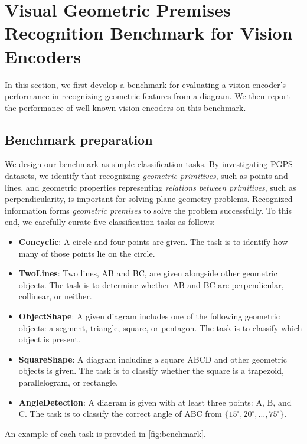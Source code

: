 \section{Visual Geometric Premises Recognition Benchmark for Vision Encoders}
\label{sec:visual_feature}

In this section, we first develop a benchmark for evaluating a vision encoder's performance in recognizing geometric features from a diagram. We then report the performance of well-known vision encoders on this benchmark.


\subsection{Benchmark preparation}
\label{sec:synthetic_data_engine}

We design our benchmark as simple classification tasks. By investigating PGPS datasets, we identify that recognizing \emph{geometric primitives}, such as points and lines, and geometric properties representing \emph{relations between primitives}, such as perpendicularity, is important for solving plane geometry problems. Recognized information forms \emph{geometric premises} to solve the problem successfully. To this end, we carefully curate five classification tasks as follows:
\begin{itemize}
    \item \textbf{Concyclic}: A circle and four points are given. The task is to identify how many of those points lie on the circle.
    \item \textbf{TwoLines}: Two lines, AB and BC, are given alongside other geometric objects. The task is to determine whether AB and BC are perpendicular, collinear, or neither.
    \item \textbf{ObjectShape}: A given diagram includes one of the following geometric objects: a segment, triangle, square, or pentagon. The task is to classify which object is present.
    \item \textbf{SquareShape}: A diagram including a square ABCD and other geometric objects is given. The task is to classify whether the square is a trapezoid, parallelogram, or rectangle.
    \item \textbf{AngleDetection}: A diagram is given with at least three points: A, B, and C. The task is to classify the correct angle of ABC from \(\{15^\circ, 20^\circ, \ldots, 75^\circ\}\). 
\end{itemize}
An example of each task is provided in \cref{fig:benchmark}.

